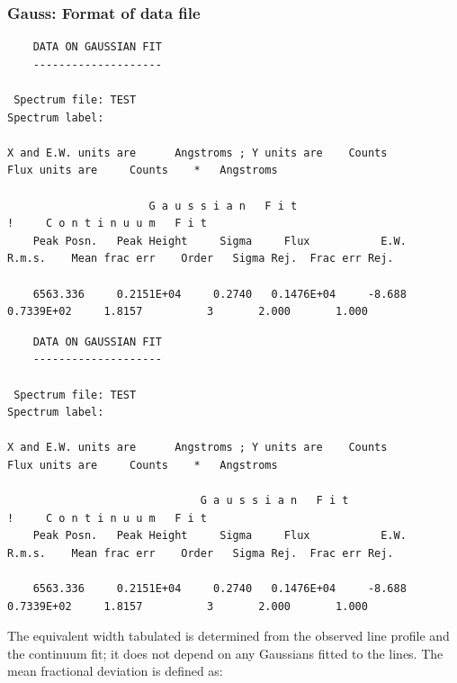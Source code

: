 \documentclass[11pt,twoside]{article}
\newenvironment{latexonly}{}{}
\begin{document}

\subsubsection{\label{gaussform}Gauss: Format of data file}

\begin{htmlonly}
\begin{verbatim}
    DATA ON GAUSSIAN FIT
    --------------------

 Spectrum file: TEST
Spectrum label:

X and E.W. units are      Angstroms ; Y units are    Counts
Flux units are     Counts    *   Angstroms

                      G a u s s i a n   F i t                                               !     C o n t i n u u m   F i t
    Peak Posn.   Peak Height     Sigma     Flux           E.W.    R.m.s.    Mean frac err    Order   Sigma Rej.  Frac err Rej.

    6563.336     0.2151E+04     0.2740   0.1476E+04     -8.688  0.7339E+02     1.8157          3       2.000       1.000
\end{verbatim}
\end{htmlonly}

\begin{latexonly}
\begin{tiny}
\begin{verbatim}
    DATA ON GAUSSIAN FIT
    --------------------

 Spectrum file: TEST
Spectrum label:

X and E.W. units are      Angstroms ; Y units are    Counts
Flux units are     Counts    *   Angstroms

                              G a u s s i a n   F i t                                                        !     C o n t i n u u m   F i t
    Peak Posn.   Peak Height     Sigma     Flux           E.W.    R.m.s.    Mean frac err    Order   Sigma Rej.  Frac err Rej.

    6563.336     0.2151E+04     0.2740   0.1476E+04     -8.688  0.7339E+02     1.8157          3       2.000       1.000
\end{verbatim}
\end{tiny}
\end{latexonly}

The equivalent width tabulated is determined from the observed line
profile and the continuum fit; it does not depend on any Gaussians
fitted to the lines.
The mean fractional deviation is defined as:
\end{document}
